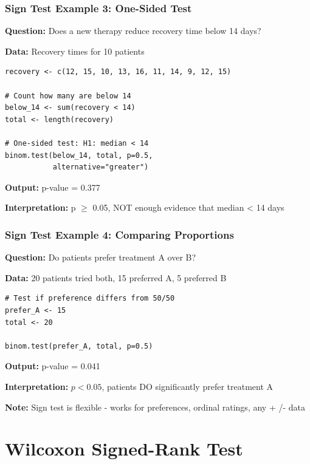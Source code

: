 \documentclass{beamer}
\begin{document}
\begin{frame}[fragile]
\frametitle{Sign Test Example 3: One-Sided Test}
\textbf{Question:} Does a new therapy reduce recovery time below 14 days?

\vspace{0.3cm}
\textbf{Data:} Recovery times for 10 patients

\vspace{0.3cm}
\begin{small}
\begin{verbatim}
recovery <- c(12, 15, 10, 13, 16, 11, 14, 9, 12, 15)

# Count how many are below 14
below_14 <- sum(recovery < 14)
total <- length(recovery)

# One-sided test: H1: median < 14
binom.test(below_14, total, p=0.5,
           alternative="greater")
\end{verbatim}
\end{small}

\textbf{Output:} p-value = 0.377

\textbf{Interpretation:} p $\geq$ 0.05, NOT enough evidence that median < 14 days
\end{frame}

\begin{frame}[fragile]
\frametitle{Sign Test Example 4: Comparing Proportions}
\textbf{Question:} Do patients prefer treatment A over B?

\vspace{0.3cm}
\textbf{Data:} 20 patients tried both, 15 preferred A, 5 preferred B

\vspace{0.3cm}
\begin{small}
\begin{verbatim}
# Test if preference differs from 50/50
prefer_A <- 15
total <- 20

binom.test(prefer_A, total, p=0.5)
\end{verbatim}
\end{small}

\textbf{Output:} p-value = 0.041

\textbf{Interpretation:} $p < 0.05$, patients DO significantly prefer treatment A

\vspace{0.3cm}
\textbf{Note:} Sign test is flexible - works for preferences, ordinal ratings, any + /- data
\end{frame}

\section{Wilcoxon Signed-Rank Test}
\end{document}
